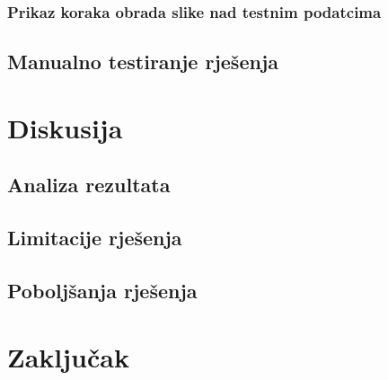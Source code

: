 \documentclass{foi}
\begin{document}
\subsection{Prikaz koraka obrada slike nad testnim podatcima}
\section{Manualno testiranje rješenja}
\chapter{Diskusija}
\section{Analiza rezultata}
\section{Limitacije rješenja}
\section{Poboljšanja rješenja}
\chapter{Zaključak}

\printbibliography[title=Popis literature]

\listoffigures
{}
 
\listoftables
{}

\appendix
\renewcommand{\thechapter}{\arabic{chapter}}
\end{document}

